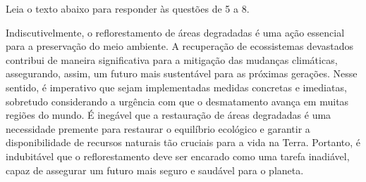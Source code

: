 




%
%



Leia o texto abaixo para responder às questões de 5 a 8.

\begin{myquote}

Indiscutivelmente, o reflorestamento de áreas degradadas é uma ação essencial
para a preservação do meio ambiente. A recuperação de
ecossistemas devastados contribui de maneira significativa para a mitigação das
mudanças climáticas, assegurando, assim, um futuro mais sustentável para as
próximas gerações. Nesse sentido, é imperativo que sejam implementadas medidas
concretas e imediatas, sobretudo considerando a urgência com que o
desmatamento avança em muitas regiões do mundo. É inegável que a restauração
de áreas degradadas é uma necessidade premente para restaurar o equilíbrio
ecológico e garantir a disponibilidade de recursos naturais tão cruciais para
a vida na Terra. Portanto, é indubitável que o reflorestamento deve ser
encarado como uma tarefa inadiável, capaz de assegurar um futuro mais seguro e
saudável para o planeta.


\end{myquote}


